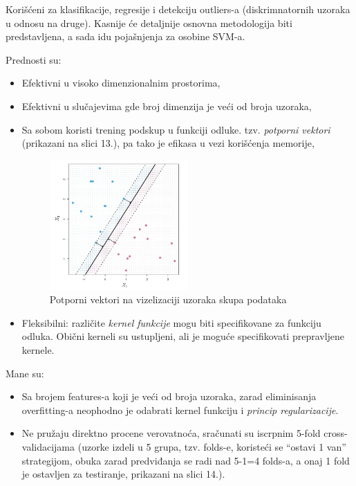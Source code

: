 \documentclass[fontsize=12bp, paper=a4]{scrarticle}
\begin{document}
Korišćeni za klasifikacije, regresije i detekciju outliers-a (diskrimnatornih uzoraka u odnosu na druge). Kasnije će detaljnije osnovna metodologija biti predstavljena, a sada idu pojašnjenja za osobine SVM-a.\cite{svm}

\vbox{}
Prednosti su:
\begin{itemize}
    \item Efektivni u visoko dimenzionalnim prostorima,
    \item Efektivni u slučajevima gde broj dimenzija je veći od broja uzoraka,
    \item Sa sobom koristi trening podskup u funkciji odluke. tzv. \textit{potporni vektori} (prikazani na slici 13.), pa tako je efikasa u vezi korišćenja memorije,
    \begin{figure}[h!]
        \centering
        \includegraphics[width=0.5\textwidth]{image-19.png}
        \caption{\centering Potporni vektori na vizelizaciji uzoraka skupa podataka}
    \end{figure}
    
    \item Fleksibilni: različite \textit{kernel funkcije} mogu biti specifikovane za funkciju odluka. Obični kerneli su ustupljeni, ali je moguće specifikovati prepravljene kernele.
\end{itemize}

Mane su:
\begin{itemize}
    \item Sa brojem features-a koji je veći od broja uzoraka, zarad eliminisanja overfitting-a neophodno je odabrati kernel funkciju i \textit{princip regularizacije}.
    \item Ne pružaju direktno procene verovatnoća, sračunati su iscrpnim 5-fold cross-validacijama (uzorke izdeli u 5 grupa, tzv. folds-e, koristeći se ``ostavi 1 van'' strategijom, obuka zarad predviđanja se radi nad 5-1=4 folds-a, a onaj 1 fold je ostavljen za testiranje, prikazani na slici 14.).%
\end{itemize}
\end{document}
